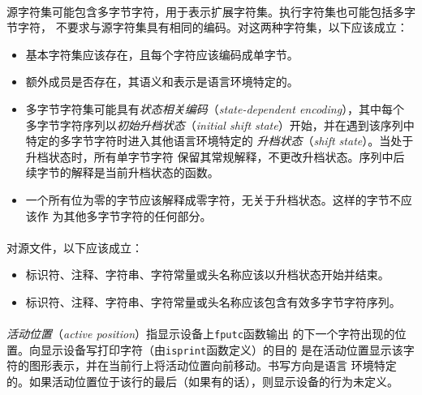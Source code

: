 \paragraph{}
源字符集可能包含多字节字符，用于表示扩展字符集。执行字符集也可能包括多字节字符，
不要求与源字符集具有相同的编码。对这两种字符集，以下应该成立：
\begin{itemize}
  \item{基本字符集应该存在，且每个字符应该编码成单字节。}
  \item{额外成员是否存在，其语义和表示是语言环境特定的。}
  \item{多字节字符集可能具有\textit{状态相关编码}（\textit{state-dependent
    encoding}），其中每个多字节字符序列以\textit{初始升档状态}（\textit{initial
    shift state}）开始，并在遇到该序列中特定的多字节字符时进入其他语言环境特定的
    \textit{升档状态}（\textit{shift state}）。当处于升档状态时，所有单字节字符
    保留其常规解释，不更改升档状态。序列中后续字节的解释是当前升档状态的函数。}
  \item{一个所有位为零的字节应该解释成零字符，无关于升档状态。这样的字节不应该作
    为其他多字节字符的任何部分。}
\end{itemize}

\paragraph{}
对源文件，以下应该成立：
\begin{itemize}
  \item{标识符、注释、字符串、字符常量或头名称应该以升档状态开始并结束。}
  \item{标识符、注释、字符串、字符常量或头名称应该包含有效多字节字符序列。}
\end{itemize}

\paragraph{}
\textit{活动位置}（\textit{active position}）指显示设备上\texttt{fputc}函数输出
的下一个字符出现的位置。向显示设备写打印字符（由\texttt{isprint}函数定义）的目的
是在活动位置显示该字符的图形表示，并在当前行上将活动位置向前移动。书写方向是语言
环境特定的。如果活动位置位于该行的最后（如果有的话），则显示设备的行为未定义。

